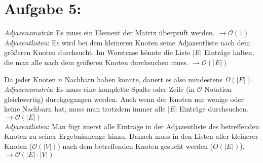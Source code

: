 \documentclass[11pt]{scrartcl} %
\begin{document}
\section*{Aufgabe 5:}
\begin{compactenum}[(a)]
\item
\emph{Adjazenzmatrix}: Es muss ein Element der Matrix überprüft werden. $\rightarrow \mathcal O(1)$\\[0.1cm]
\emph{Adjazentlisten}: Es wird bei dem kleineren Knoten seine Adjazentliste nach dem größeren Knoten durchsucht. Im Worstcase könnte die Liste $|E|$ Einträge halten, die man alle nach dem größeren Knoten durchsuchen muss. $\rightarrow \mathcal O(|E|)$\\
\item
Da jeder Knoten $n$ Nachbarn haben könnte, dauert es also mindestens $\Omega(|E|)$.\\[0.2cm]
\emph{Adjazenzmatrix}: Es muss eine komplette Spalte oder Zeile (in $\mathcal O$ Notation gleichwertig) durchgegangen werden. Auch wenn der Knoten nur wenige oder keine Nachbarn hat, muss man trotzdem immer alle $|E|$ Einträge durchsuchen. $\rightarrow \mathcal O(|E|)$\\[0.1cm]
\emph{Adjazentlisten}: Man fügt zuerst alle Einträge in der Adjazentliste des betreffenden Knoten zu seiner Ergebnismenge hinzu. Danach muss in den Listen aller kleinerer Knoten ($\mathcal O(|V|)$) nach dem betreffenden Knoten gesucht werden ($O(|E|)$). $\rightarrow \mathcal O(|E| \cdot |V|)$
\end{compactenum}
\end{document}
